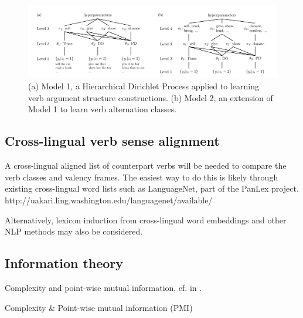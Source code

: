 \begin{figure}
    \includegraphics[width=\textwidth]{figures/verb_alternation_classes.png}
    \centering
    \caption{(a) Model 1, a Hierarchical Dirichlet Process applied to learning verb argument structure constructions. (b) Model 2,
    an extension of Model 1 to learn verb alternation classes.}\label{fig:parisien2010}
\end{figure}

\subsection{Cross-lingual verb sense alignment}\label{subsec:verblist}

A cross-lingual aligned list of counterpart verbs will be needed to compare the verb classes and valency frames. The easiest way to do this is likely through existing cross-lingual word lists such as LanguageNet, part of the PanLex project. http://uakari.ling.washington.edu/languagenet/available/

Alternatively, lexicon induction from cross-lingual word embeddings and other NLP methods may also be considered.

\subsection{Information theory}\label{subsec:infotheory}

Complexity and point-wise mutual information, cf. in \citet{say2014}.

Complexity \& Point-wise mutual information (PMI)